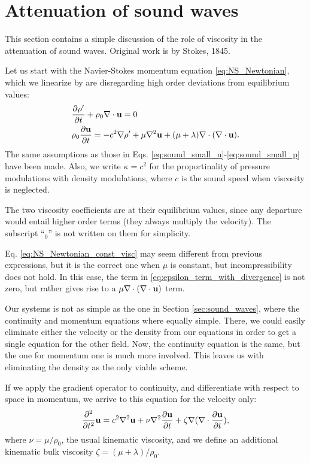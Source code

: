 \section{Attenuation of sound waves}
\label{sec:sound_waves_att}

This section contains a simple discussion of the role of viscosity in
the attenuation of sound waves. Original work is by Stokes, 1845.

Let us start with the Navier-Stokes momentum equation
\ref{eq:NS_Newtonian},
which we linearize by are disregarding high
order deviations from equilibrium values:
\begin{align}
  & \frac{\partial\rho' }{\partial t}  + \rho_0 \nabla\cdot\mathbf{u} =0 \\
  & \label{eq:NS_Newtonian_const_visc}
    \rho_0 \frac{\partial \mathbf{u} }{\partial t} =
    - c^2 \nabla \rho' + \mu \nabla^2 \mathbf{u}
    + ( \mu + \lambda ) \nabla\cdot ( \nabla\cdot\mathbf{u} ) .
\end{align}
The same assumptions as those in
Eqs. \ref{eq:sound_small_u}-\ref{eq:sound_small_p} have been made.
Also, we write $\kappa = c^2$ for the proportinality of pressure
modulations with density modulations, where $c$ is the sound speed
when viscosity is neglected.

The two viscosity coefficients are at their equilibrium values, since
any departure would entail higher order terms (they always multiply
the velocity). The subscript ``$_0$'' is not written on them for
simplicity.

Eq. \ref{eq:NS_Newtonian_const_visc} may seem different from previous
expressions, but it is the correct one when $\mu$ is constant, but
incompressibility does not hold. In this case, the term in
\ref{eq:epsilon_term_with_divergence} is not zero, but rather gives
rise to a $\mu \nabla\cdot ( \nabla\cdot\mathbf{u} )$ term.

Our systems is not as simple as the one in Section
\ref{sec:sound_waves}, where the continuity and momentum equations
where equally simple. There, we could easily eliminate either the
velocity or the density from our equations in order to get a single
equation for the other field. Now, the continuity equation is the
same, but the one for momentum one is much more involved. This leaves
us with eliminating the density as the only viable scheme.

If we apply the gradient operator to continuity, and differentiate
with respect to space in momentum, we arrive to this equation for
the velocity only:
\begin{equation}
  \label{eq:sound_att_Fourier}
  \frac{\partial^2 }{\partial t^2 } \mathbf{u} =
  c^2\nabla^2 \mathbf{u} + \nu \nabla^2\frac{\partial\mathbf{u}}{\partial t} +
  \zeta \nabla (\nabla\cdot \frac{\partial\mathbf{u}}{\partial t} ) ,
\end{equation}
where $\nu=\mu/\rho_0$, the usual kinematic viscosity, and we define
an additional kinematic bulk viscosity $\zeta=(\mu+\lambda)/\rho_0$.

